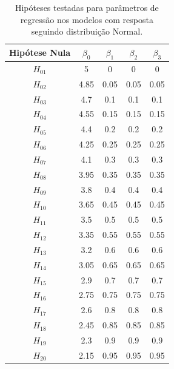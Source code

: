 \documentclass[AMA,STIX1COL]{WileyNJD-v2}
\begin{document}
\begin{table}[H]
\centering
\begin{tabular}{c|cccc}
\hline
Hipótese Nula & $\beta_0$ & $\beta_1$ & $\beta_2$ & $\beta_3$ \\ \hline
$H_{01}$      & 5         & 0         & 0         & 0         \\
$H_{02}$      & 4.85      & 0.05      & 0.05      & 0.05      \\
$H_{03}$      & 4.7       & 0.1       & 0.1       & 0.1       \\
$H_{04}$      & 4.55      & 0.15      & 0.15      & 0.15      \\
$H_{05}$      & 4.4       & 0.2       & 0.2       & 0.2       \\
$H_{06}$      & 4.25      & 0.25      & 0.25      & 0.25      \\
$H_{07}$      & 4.1       & 0.3       & 0.3       & 0.3       \\
$H_{08}$      & 3.95      & 0.35      & 0.35      & 0.35      \\
$H_{09}$      & 3.8       & 0.4       & 0.4       & 0.4       \\
$H_{10}$      & 3.65      & 0.45      & 0.45      & 0.45      \\
$H_{11}$      & 3.5       & 0.5       & 0.5       & 0.5       \\
$H_{12}$      & 3.35      & 0.55      & 0.55      & 0.55      \\
$H_{13}$      & 3.2       & 0.6       & 0.6       & 0.6       \\
$H_{14}$      & 3.05      & 0.65      & 0.65      & 0.65      \\
$H_{15}$      & 2.9       & 0.7       & 0.7       & 0.7       \\
$H_{16}$      & 2.75      & 0.75      & 0.75      & 0.75      \\
$H_{17}$      & 2.6       & 0.8       & 0.8       & 0.8       \\
$H_{18}$      & 2.45      & 0.85      & 0.85      & 0.85      \\
$H_{19}$      & 2.3       & 0.9       & 0.9       & 0.9       \\
$H_{20}$      & 2.15      & 0.95      & 0.95      & 0.95      \\ \hline
\end{tabular}
\caption{Hipóteses testadas para parâmetros de regressão nos modelos com resposta seguindo distribuição Normal.}
\label{tab:hipoteses_beta_normal}
\end{table}
\end{document}

